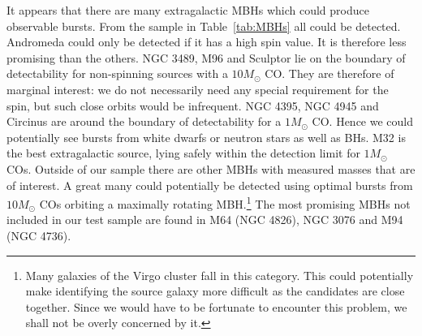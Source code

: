 \documentclass[useAMS,usedcolumn,usegraphicx,usenatbib]{mn2e}
\newcommand{\tabref}[1]{Table~\ref{tab:#1}}
\begin{document}
It appears that there are many extragalactic MBHs which could produce observable bursts. From the sample in \tabref{MBHs} all could be detected. Andromeda could only be detected if it has a high spin value. It is therefore less promising than the others. NGC 3489, M96 and Sculptor lie on the boundary of detectability for non-spinning sources with a $10 M_\odot$ CO. They are therefore of marginal interest: we do not necessarily need any special requirement for the spin, but such close orbits would be infrequent. NGC 4395, NGC 4945 and Circinus are around the boundary of detectability for a $1 M_\odot$ CO. Hence we could potentially see bursts from white dwarfs or neutron stars as well as BHs. M32 is the best extragalactic source, lying safely within the detection limit for $1 M_\odot$ COs. Outside of our sample there are other MBHs with measured masses that are of interest. A great many could potentially be detected using optimal bursts from $10 M_\odot$ COs orbiting a maximally rotating MBH.\footnote{Many galaxies of the Virgo cluster fall in this category. This could potentially make identifying the source galaxy more difficult as the candidates are close together. Since we would have to be fortunate to encounter this problem, we shall not be overly concerned by it.} The most promising MBHs not included in our test sample are found in M64 (NGC 4826), NGC 3076 and M94 (NGC 4736).
\end{document}
